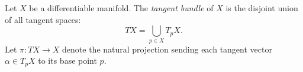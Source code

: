Let $X$ be a differentiable manifold. The \emph{tangent bundle} of $X$ is the disjoint union of all tangent spaces:
$$
TX = \bigcup_{p \in X} T_p X.
$$
Let $\pi \colon TX \to X$ denote the natural projection sending each tangent vector $\alpha \in T_p X$ to its base point $p$.
